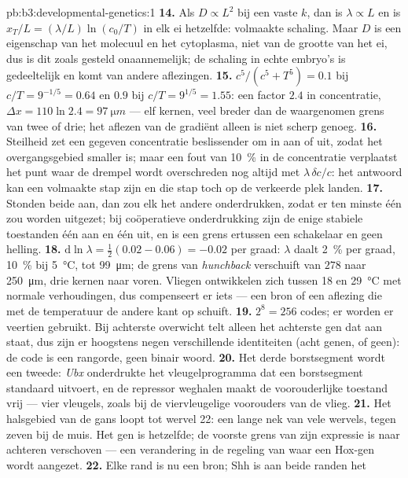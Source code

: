 \begin{solution}{pb:b3:developmental-genetics:1}
\textbf{14.} Als $D \propto L^{2}$ bij een vaste $k$, dan is
$\lambda \propto L$ en is $x_{T}/L = (\lambda/L)\ln(c_{0}/T)$ in elk ei
hetzelfde: volmaakte schaling. Maar $D$ is een eigenschap van het
molecuul en het cytoplasma, niet van de grootte van het ei, dus is dit
zoals gesteld onaannemelijk; de schaling in echte embryo's is
gedeeltelijk en komt van andere aflezingen.
\textbf{15.} $c^{5}/(c^{5} + T^{5}) = 0.1$ bij $c/T = 9^{-1/5} = 0.64$
en $0.9$ bij $c/T = 9^{1/5} = 1.55$: een factor $2.4$ in concentratie,
$\Delta x = 110\ln 2.4 = \qty{97}{\micro m}$ --- elf kernen, veel
breder dan de waargenomen grens van twee of drie; het aflezen van de
gradiënt alleen is niet scherp genoeg.
\textbf{16.} Steilheid zet een gegeven concentratie beslissender om in
aan of uit, zodat het overgangsgebied smaller is; maar een fout van
\qty{10}{\%} in de concentratie verplaatst het punt waar de drempel
wordt overschreden nog altijd met $\lambda\,\delta c/c$: het antwoord
kan een volmaakte stap zijn en die stap toch op de verkeerde plek
landen.
\textbf{17.} Stonden beide aan, dan zou elk het andere onderdrukken,
zodat er ten minste één zou worden uitgezet; bij coöperatieve
onderdrukking zijn de enige stabiele toestanden één aan en één uit, en
is een grens ertussen een schakelaar en geen helling.
\textbf{18.} $\mathrm{d}\ln\lambda = \tfrac{1}{2}(0.02 - 0.06) = -0.02$
per graad: $\lambda$ daalt \qty{2}{\%} per graad, \qty{10}{\%} bij
\qty{5}{\celsius}, tot \qty{99}{\micro m}; de grens van
\emph{hunchback} verschuift van $278$ naar \qty{250}{\micro m}, drie
kernen naar voren. Vliegen ontwikkelen zich tussen \qty{18}{} en
\qty{29}{\celsius} met normale verhoudingen, dus compenseert er iets
--- een bron of een aflezing die met de temperatuur de andere kant op
schuift.
\textbf{19.} $2^{8} = 256$ codes; er worden er veertien gebruikt. Bij
achterste overwicht telt alleen het achterste gen dat aan staat, dus
zijn er hoogstens negen verschillende identiteiten (acht genen, of
geen): de code is een rangorde, geen binair woord.
\textbf{20.} Het derde borstsegment wordt een tweede: \emph{Ubx}
onderdrukte het vleugelprogramma dat een borstsegment standaard
uitvoert, en de repressor weghalen maakt de voorouderlijke toestand
vrij --- vier vleugels, zoals bij de viervleugelige voorouders van de
vlieg.
\textbf{21.} Het halsgebied van de gans loopt tot wervel 22: een lange
nek van vele wervels, tegen zeven bij de muis. Het gen is hetzelfde; de
voorste grens van zijn expressie is naar achteren verschoven --- een
verandering in de regeling van waar een Hox-gen wordt aangezet.
\textbf{22.} Elke rand is nu een bron; Shh is aan beide randen het

\end{solution}
